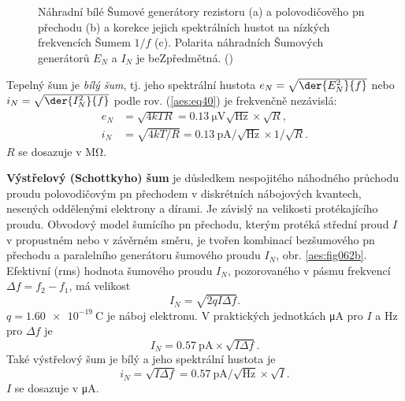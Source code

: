         \begin{figure}[ht!]  %
          \centering
                   \\                                           
                   \\    
          \caption{ Náhradní bílé Šumové generátory rezistoru (a) a polovodičověho pn přechodu (b)
                    a korekce jejich spektrálních hustot na nízkých frekvencích Šumem \(1/f\) (c).
                    Polarita náhradních Šumových generátorů \(E_N\) a \(I_N\) je beZpředmětná.
                    (\cite[s.~49]{Dostal})}
          \label{aes:fig062}
        \end{figure}

        Tepelný šum je \emph{bílý šum}, tj. jeho spektrální hustota \(e_N =
        \sqrt{\der{E_N^2}{f}}\) nebo \(i_N = \sqrt{\der{I_N^2}{f}}\) podle rov. (\ref{aes:eq40})
        je frekvenčně nezávislá:
        \begin{equation}\label{aes:eq074} 
          \begin{split}
            e_N &= \sqrt{4kTR}  = \qty{0.13}{\uV}\sqrt{\unit{\Hz}}\times\sqrt{R},                 \\
            i_N &= \sqrt{4kT/R} = \qty{0.13}{\pA}/\sqrt{\unit{\Hz}}\times1/\sqrt{R}.
          \end{split}
        \end{equation}
        \(R\) se dosazuje v \unit{\mega\ohm}.

        \textbf{Výstřelový (Schottkyho) šum} je důsledkem nespojitého náhodného průchodu proudu
        polovodičovým pn přechodem v diskrétních nábojových kvantech, nesených oddělenými elektrony
        a dírami. Je závislý na velikosti protékajícího proudu. Obvodový model šumícího pn přechodu,
        kterým protéká střední proud \(I\) v propustném nebo v závěrném směru, je tvořen kombinací
        bezšumového pn přechodu a paralelního generátoru šumového proudu \(I_N\), obr.
        \ref{aes:fig062b}. Efektivní (rms) hodnota šumového proudu \(I_N\), pozorovaného v pásmu
        frekvencí \(\Delta f = f_2 - f_1\), má velikost
        \begin{equation}\label{aes:eq075}
          I_N = \sqrt{2qI\Delta f}.
        \end{equation}
        \(q = \qty{1.60e-19}{\coulomb}\) je náboj elektronu. V praktických jednotkách \unit{\uA} pro
        \(I\) a \unit{\Hz} pro \(\Delta f\) je
        \begin{equation}\label{aes:eq076}
          I_N = \qty{0.57}{\pA}\times\sqrt{I\Delta f}.
        \end{equation}
        Také výstřelový šum je bílý a jeho spektrální hustota je 
        \begin{equation}\label{aes:eq077}
          i_N = \sqrt{I\Delta f} = \qty{0.57}{\pA}/\sqrt{\unit{\Hz}}\times\sqrt{I}.
        \end{equation}
        \(I\) se dosazuje v \unit{\uA}.

